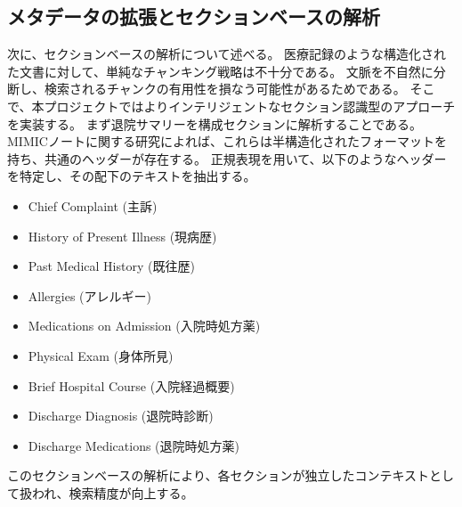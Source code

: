 \documentclass[12pt,a4paper]{jsarticle}
\begin{document}
\subsection{メタデータの拡張とセクションベースの解析}
次に、セクションベースの解析について述べる。
医療記録のような構造化された文書に対して、単純なチャンキング戦略は不十分である。
文脈を不自然に分断し、検索されるチャンクの有用性を損なう可能性があるためである。
そこで、本プロジェクトではよりインテリジェントなセクション認識型のアプローチを実装する。
まず退院サマリーを構成セクションに解析することである。
MIMICノートに関する研究によれば、これらは半構造化されたフォーマットを持ち、共通のヘッダーが存在する。
正規表現を用いて、以下のようなヘッダーを特定し、その配下のテキストを抽出する。
\begin{itemize}
	\item Chief Complaint (主訴)
	\item History of Present Illness (現病歴)
	\item Past Medical History (既往歴)
	\item Allergies (アレルギー)
	\item Medications on Admission (入院時処方薬)
	\item Physical Exam (身体所見)
	\item Brief Hospital Course (入院経過概要)
	\item Discharge Diagnosis (退院時診断)
	\item Discharge Medications (退院時処方薬)
\end{itemize}
このセクションベースの解析により、各セクションが独立したコンテキストとして扱われ、検索精度が向上する。
\end{document}
